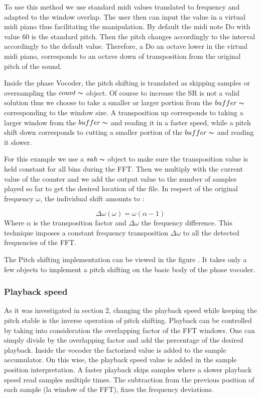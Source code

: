     To use this method we use standard midi values translated to frequency and adapted to the window overlap. The user then can input the value in a virtual midi piano thus facilitating the manipulation. By default the midi note Do with value 60 is the standard pitch. Then the pitch changes accordingly to the interval accordingly to the default value. Therefore, a Do an octave lower in the virtual midi piano, corresponds to an octave down of transposition from the original pitch of the sound.

    Inside the phase Vocoder, the pitch shifting is translated as skipping samples or oversampling the $count\thicksim$ object. Of course to increase the SR is not a valid solution thus we choose to take a smaller or larger portion from the $buffer\thicksim$ corresponding to the window size. A transposition up corresponds to taking a larger window from the $buffer\thicksim$ and reading it in a faster speed, while a pitch shift down corresponds to cutting a smaller portion of the $buffer\thicksim$ and reading it slower.

    For this example we use a $sah\thicksim$ object to make sure the transposition value is held constant for all bins during the FFT. Then we multiply with the current value of the counter and we add the output value to the number of samples played so far to get the desired location of the file. In respect of the original frequency $\omega$, the individual shift amounts to : 

    \begin{equation*}
        \Delta \omega(\omega) = \omega (\alpha - 1)
    \end{equation*}
    Where $\alpha$ is the transposition factor and $\Delta \omega $ the frequency difference. This technique imposes a constant frequency transposition $\Delta \omega$ to all the detected frequencies of the FFT.

    The Pitch shifting implementation can be viewed in the figure . It takes only a few objects to implement a pitch shifting on the basic body of the phase vocoder.



\subsubsection{Playback speed}

    As it was investigated in section 2, changing the playback speed while keeping the pitch stable is the inverse operation of pitch shifting. Playback can be controlled by taking into consideration the overlapping factor of the FFT windows. One can simply divide by the overlapping factor and add the percentage of the desired playback. Inside the vocoder the factorized value is added to the sample accumulator. On this wise, the playback speed value is added in the sample position interpretation. A faster playback skips samples where a slower playback speed read samples multiple times. The subtraction from the previous position of each sample (la window of the FFT), fixes the frequency deviations. 

